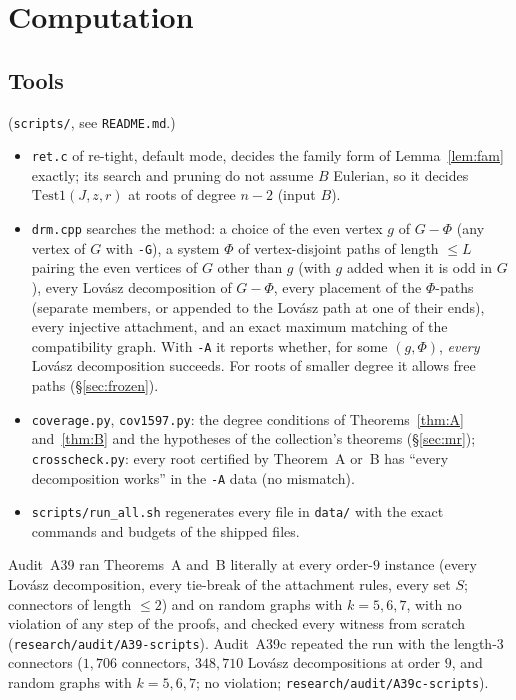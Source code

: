 \documentclass[11pt]{amsart}
\theoremstyle{definition}
\begin{document}
\section{Computation}\label{sec:comp}

\subsection*{Tools} (\texttt{scripts/}, see \texttt{README.md}.)
\begin{itemize}[leftmargin=*]
\item \texttt{ret.c} of re-tight, default mode, decides the family form of Lemma~\ref{lem:fam} exactly;
its search and pruning do not assume $B$ Eulerian, so it decides $\mathrm{Test1}(J,z,r)$ at roots of
degree $n-2$ (input $B$).
\item \texttt{drm.cpp} searches the method: a choice of the even vertex $g$ of $G-\Phi$ (any vertex of
$G$ with \texttt{-G}), a system $\Phi$ of vertex-disjoint paths of length $\le L$ pairing the even
vertices of $G$ other than $g$ (with $g$ added when it is odd in $G$), every Lov\'asz decomposition of
$G-\Phi$, every placement of the $\Phi$-paths (separate members, or appended to the Lov\'asz path at
one of their ends), every injective attachment, and an exact maximum matching of the compatibility
graph. With \texttt{-A} it reports whether, for some $(g,\Phi)$, \emph{every} Lov\'asz decomposition
succeeds. For roots of smaller degree it allows free paths (\S\ref{sec:frozen}).
\item \texttt{coverage.py}, \texttt{cov1597.py}: the degree conditions of Theorems~\ref{thm:A}
and~\ref{thm:B} and the hypotheses of the collection's theorems (\S\ref{sec:mr});
\texttt{crosscheck.py}: every root certified by Theorem~A or~B has ``every decomposition works'' in the
\texttt{-A} data (no mismatch).
\item \texttt{scripts/run\_all.sh} regenerates every file in \texttt{data/} with the exact commands and
budgets of the shipped files.
\end{itemize}
Audit~A39 ran Theorems~A and~B literally at every order-$9$ instance (every Lov\'asz decomposition, every
tie-break of the attachment rules, every set $S$; connectors of length $\le2$) and on random graphs with
$k=5,6,7$, with no violation of any step of the proofs, and checked every witness from scratch
(\texttt{research/audit/A39-scripts}). Audit~A39c repeated the run with the length-$3$ connectors
($1{,}706$ connectors, $348{,}710$ Lov\'asz decompositions at order $9$, and random graphs with
$k=5,6,7$; no violation; \texttt{research/audit/A39c-scripts}).
\end{document}
